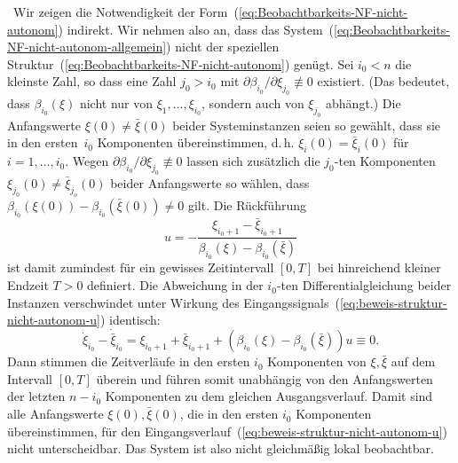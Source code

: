 \begin{svmultproof2}
\notwendig\ Wir zeigen die Notwendigkeit der Form~(\ref{eq:Beobachtbarkeits-NF-nicht-autonom})
indirekt. Wir nehmen also an, dass das System~(\ref{eq:Beobachtbarkeits-NF-nicht-autonom-allgemein})
nicht der speziellen Struktur~(\ref{eq:Beobachtbarkeits-NF-nicht-autonom})
genügt. Sei $i_{0}<n$ die kleinste Zahl, so dass eine Zahl $j_{0}>i_{0}$
mit $\partial\beta_{i_{0}}/\partial\xi_{j_{0}}\not\equiv0$ existiert.
(Das bedeutet, dass $\beta_{i_{0}}(\xi)$ nicht nur von $\xi_{1},\ldots,\xi_{i_{0}}$,
sondern auch von $\xi_{j_{0}}$ abhängt.) Die Anfangswerte $\xi(0)\neq\bar{\xi}(0)$
beider Systeminstanzen seien so gewählt, dass sie in den ersten~$i_{0}$
Komponenten übereinstimmen, d.\,h. $\xi_{i}(0)=\bar{\xi}_{i}(0)$
für $i=1,\ldots,i_{0}$. Wegen $\partial\beta_{i_{0}}/\partial\xi_{j_{0}}\not\equiv0$
lassen sich zusätzlich die $j_{0}$-ten Komponenten $\xi_{j_{0}}(0)\neq\bar{\xi}_{j_{o}}(0)$
beider Anfangswerte so wählen, dass $\beta_{i_{0}}(\xi(0))-\beta_{i_{0}}(\bar{\xi}(0))\neq0$
gilt. Die Rückführung 
\begin{equation}
u=-\frac{\xi_{i_{0}+1}-\bar{\xi}_{i_{0}+1}}{\beta_{i_{0}}(\xi)-\beta_{i_{0}}(\bar{\xi})}\label{eq:beweis-struktur-nicht-autonom-u}
\end{equation}
ist damit zumindest für ein gewisses Zeitintervall $[0,T]$ bei hinreichend
kleiner Endzeit $T>0$ definiert. Die Abweichung in der $i_{0}$-ten
Differentialgleichung beider Instanzen verschwindet unter Wirkung
des Eingangssignals~(\ref{eq:beweis-struktur-nicht-autonom-u}) identisch:
\[
\dot{\xi}_{i_{0}}-\dot{\bar{\xi}}_{i_{0}}=\xi_{i_{0}+1}+\bar{\xi}_{i_{0}+1}+\left(\beta_{i_{0}}(\xi)-\beta_{i_{0}}(\bar{\xi})\right)u\equiv0.
\]
Dann stimmen die Zeitverläufe in den ersten $i_{0}$ Komponenten von
$\xi,\bar{\xi}$ auf dem Intervall $[0,T]$ überein und führen somit
unabhängig von den Anfangswerten der letzten $n-i_{0}$ Komponenten
zu dem gleichen Ausgangsverlauf. Damit sind alle Anfangswerte $\xi(0),\bar{\xi}(0)$,
die in den ersten $i_{0}$ Komponenten übereinstimmen, für den Eingangsverlauf~(\ref{eq:beweis-struktur-nicht-autonom-u})
nicht unterscheidbar. Das System ist also nicht gleichmäßig lokal
beobachtbar.


\end{svmultproof2}
